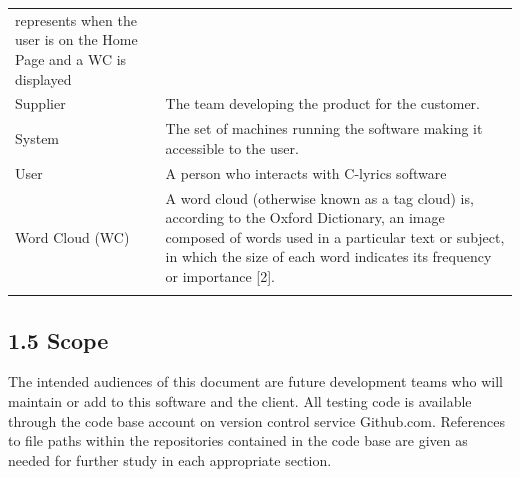 \documentclass[]{article}
\begin{document}
\begin{longtable}[c]{@{}ll@{}}
\begin{minipage}[t]{0.47\columnwidth}
represents when the user is on the Home Page and a WC is displayed
\end{minipage}
\\\addlinespace
\begin{minipage}[t]{0.47\columnwidth}\raggedright
Supplier
\end{minipage} & \begin{minipage}[t]{0.47\columnwidth}\raggedright
The team developing the product for the customer.
\end{minipage}
\\\addlinespace
\begin{minipage}[t]{0.47\columnwidth}\raggedright
System
\end{minipage} & \begin{minipage}[t]{0.47\columnwidth}\raggedright
The set of machines running the software making it accessible to the
user.
\end{minipage}
\\\addlinespace
\begin{minipage}[t]{0.47\columnwidth}\raggedright
User
\end{minipage} & \begin{minipage}[t]{0.47\columnwidth}\raggedright
A person who interacts with C-lyrics software
\end{minipage}
\\\addlinespace
\begin{minipage}[t]{0.47\columnwidth}\raggedright
Word Cloud (WC)
\end{minipage} & \begin{minipage}[t]{0.47\columnwidth}\raggedright
A word cloud (otherwise known as a tag cloud) is, according to the
Oxford Dictionary, an image composed of words used in a particular text
or subject, in which the size of each word indicates its frequency or
importance {[}2{]}.
\end{minipage}
\\\addlinespace
\bottomrule
\end{longtable}


\subsection{1.5 Scope}\label{scope}

The intended audiences of this document are future development teams who
will maintain or add to this software and the client. All testing code
is available through the code base account on version control service
Github.com. References to file paths within the repositories contained
in the code base are given as needed for further study in each
appropriate section.
\end{document}
